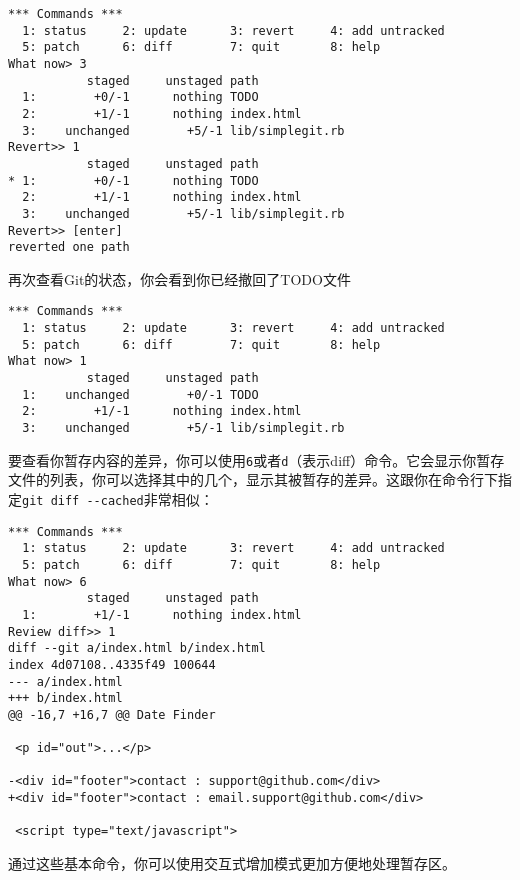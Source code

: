 \documentclass[a4paper]{book}
\begin{document}
\begin{shaded}\begin{verbatim}
*** Commands ***
  1: status     2: update      3: revert     4: add untracked
  5: patch      6: diff        7: quit       8: help
What now> 3
           staged     unstaged path
  1:        +0/-1      nothing TODO
  2:        +1/-1      nothing index.html
  3:    unchanged        +5/-1 lib/simplegit.rb
Revert>> 1
           staged     unstaged path
* 1:        +0/-1      nothing TODO
  2:        +1/-1      nothing index.html
  3:    unchanged        +5/-1 lib/simplegit.rb
Revert>> [enter]
reverted one path
\end{verbatim}\end{shaded}

再次查看Git的状态，你会看到你已经撤回了TODO文件

\begin{shaded}\begin{verbatim}
*** Commands ***
  1: status     2: update      3: revert     4: add untracked
  5: patch      6: diff        7: quit       8: help
What now> 1
           staged     unstaged path
  1:    unchanged        +0/-1 TODO
  2:        +1/-1      nothing index.html
  3:    unchanged        +5/-1 lib/simplegit.rb
\end{verbatim}\end{shaded}

要查看你暂存内容的差异，你可以使用\texttt{6}或者\texttt{d}（表示diff）命令。它会显示你暂存文件的列表，你可以选择其中的几个，显示其被暂存的差异。这跟你在命令行下指定\texttt{git diff -{}-cached}非常相似：

\begin{shaded}\begin{verbatim}
*** Commands ***
  1: status     2: update      3: revert     4: add untracked
  5: patch      6: diff        7: quit       8: help
What now> 6
           staged     unstaged path
  1:        +1/-1      nothing index.html
Review diff>> 1
diff --git a/index.html b/index.html
index 4d07108..4335f49 100644
--- a/index.html
+++ b/index.html
@@ -16,7 +16,7 @@ Date Finder

 <p id="out">...</p>

-<div id="footer">contact : support@github.com</div>
+<div id="footer">contact : email.support@github.com</div>

 <script type="text/javascript">
\end{verbatim}\end{shaded}

通过这些基本命令，你可以使用交互式增加模式更加方便地处理暂存区。
\end{document}
